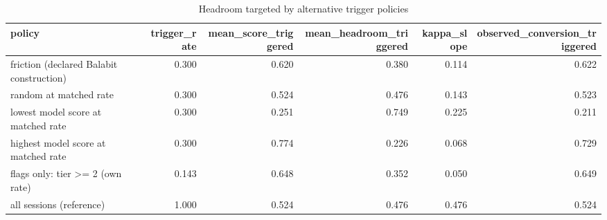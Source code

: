 \begin{table}
\caption{Headroom targeted by alternative trigger policies}
\begin{tabular}{lrrrrr}
\toprule
policy & trigger\_rate & mean\_score\_triggered & mean\_headroom\_triggered & kappa\_slope & observed\_conversion\_triggered \\
\midrule
friction (declared Balabit construction) & 0.300 & 0.620 & 0.380 & 0.114 & 0.622 \\
random at matched rate & 0.300 & 0.524 & 0.476 & 0.143 & 0.523 \\
lowest model score at matched rate & 0.300 & 0.251 & 0.749 & 0.225 & 0.211 \\
highest model score at matched rate & 0.300 & 0.774 & 0.226 & 0.068 & 0.729 \\
flags only: tier >= 2 (own rate) & 0.143 & 0.648 & 0.352 & 0.050 & 0.649 \\
all sessions (reference) & 1.000 & 0.524 & 0.476 & 0.476 & 0.524 \\
\bottomrule
\end{tabular}
\end{table}
